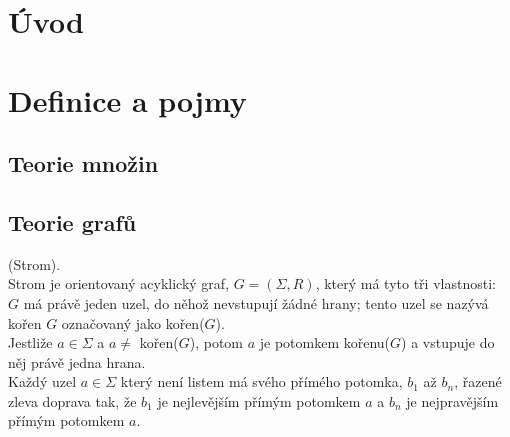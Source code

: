 
\chapter{Úvod}

\chapter{Definice a pojmy}

\section{Teorie množin}

\section{Teorie grafů}
\begin{defn}
  (Strom). \cite[str. 12]{Koutny}\\
  Strom je orientovaný acyklický graf, $G = (\Sigma, R)$, který má tyto
  tři vlastnosti: \\
  \indent
  $G$ má právě jeden uzel, do něhož nevstupují žádné hrany;
  tento uzel se nazývá kořen $G$ označovaný jako kořen($G$).\\
  \indent
  Jestliže $a \in \Sigma$ a $a \neq$ kořen($G$), potom $a$ je
  potomkem kořenu($G$) a vstupuje do něj právě jedna hrana.\\
  \indent
  Každý uzel $a \in \Sigma$ který není listem má svého přímého potomka,
  $b_1$ až $b_n$, řazené zleva doprava tak, že $b_1$ je
  nejlevějším přímým potomkem $a$ a $b_n$ je nejpravějším přímým
  potomkem $a$.
\end{defn}

